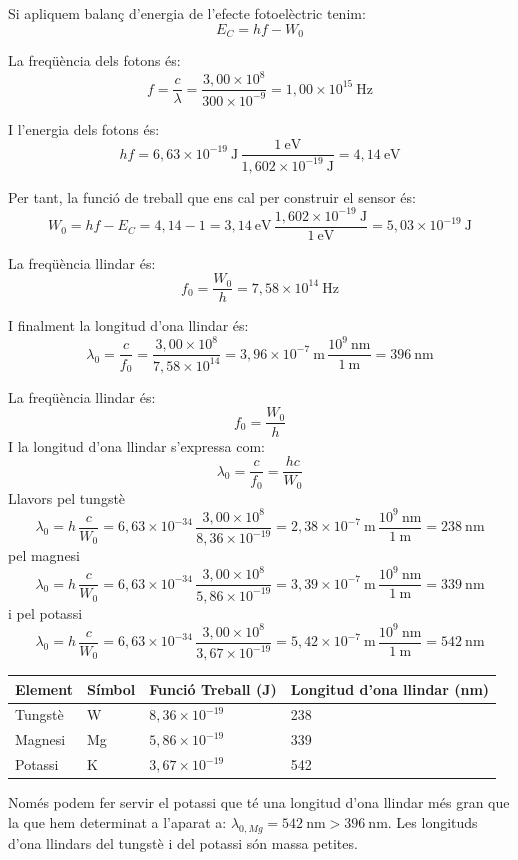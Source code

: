 \begin{solapartat}
 Si apliquem balanç d'energia de l'efecte fotoelèctric tenim:
\[ E_C = hf - W_0 \]

 La freqüència dels fotons és:
\[ f = \frac{c}{\lambda} = \frac{3,00\times 10^{8}}{300\times 10^{-9}} = 1,00\times 10^{15}\ \mathrm{Hz} \]

 I l'energia dels fotons és:
\[ hf = 6,63\times 10^{-19}\ \mathrm{J}\,\frac{1\ \mathrm{eV}}{1,602\times 10^{-19}\ \mathrm{J}} = 4,14\ \mathrm{eV} \]

 Per tant, la funció de treball que ens cal per construir el sensor és:
\[ W_0 = hf - E_C = 4,14 - 1 = 3,14\ \mathrm{eV}\,\frac{1,602\times 10^{-19}\ \mathrm{J}}{1\ \mathrm{eV}} = 5,03\times 10^{-19}\ \mathrm{J} \]

 La freqüència llindar és:
\[ f_0 = \frac{W_0}{h} = 7,58\times 10^{14}\ \mathrm{Hz} \]

 I finalment la longitud d'ona llindar és:
\[ \lambda_0 = \frac{c}{f_0} = \frac{3,00\times 10^{8}}{7,58\times 10^{14}} = 3,96\times 10^{-7}\ \mathrm{m}\,\frac{10^{9}\ \mathrm{nm}}{1\ \mathrm{m}} = 396\ \mathrm{nm} \]
\end{solapartat}

\begin{solapartat}
 La freqüència llindar és:
\[ f_0 = \frac{W_0}{h} \]
I la longitud d'ona llindar s'expressa com:
\[ \lambda_0 = \frac{c}{f_0} = \frac{hc}{W_0} \]
Llavors pel tungstè
\[ \lambda_0 = h\,\frac{c}{W_0} = 6,63\times 10^{-34}\,\frac{3,00\times 10^{8}}{8,36\times 10^{-19}} = 2,38\times 10^{-7}\ \mathrm{m}\,\frac{10^{9}\ \mathrm{nm}}{1\ \mathrm{m}} = 238\ \mathrm{nm} \]
pel magnesi
\[ \lambda_0 = h\,\frac{c}{W_0} = 6,63\times 10^{-34}\,\frac{3,00\times 10^{8}}{5,86\times 10^{-19}} = 3,39\times 10^{-7}\ \mathrm{m}\,\frac{10^{9}\ \mathrm{nm}}{1\ \mathrm{m}} = 339\ \mathrm{nm} \]
i pel potassi
\[ \lambda_0 = h\,\frac{c}{W_0} = 6,63\times 10^{-34}\,\frac{3,00\times 10^{8}}{3,67\times 10^{-19}} = 5,42\times 10^{-7}\ \mathrm{m}\,\frac{10^{9}\ \mathrm{nm}}{1\ \mathrm{m}} = 542\ \mathrm{nm} \]

\begin{center}
\begin{tabular}{|l|l|l|l|}
\hline
Element & Símbol & Funció Treball (J) & Longitud d'ona llindar (nm) \\
\hline
Tungstè & W & $8,36\times 10^{-19}$ & 238 \\
\hline
Magnesi & Mg & $5,86\times 10^{-19}$ & 339 \\
\hline
Potassi & K & $3,67\times 10^{-19}$ & 542 \\
\hline
\end{tabular}
\end{center}

 Només podem fer servir el potassi que té una longitud d'ona llindar més gran que la que hem determinat a l'aparat a: $\lambda_{0,Mg} = 542\ \mathrm{nm} > 396\ \mathrm{nm}$. Les longituds d'ona llindars del tungstè i del potassi són massa petites.
\end{solapartat}
